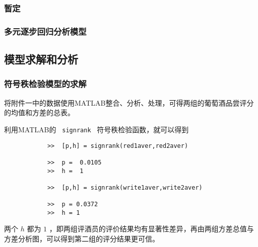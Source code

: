 \documentclass[nocover]{cumcmart}%
\begin{document}
        \subsubsection{暂定}


        \subsubsection{多元逐步回归分析模型}




    \subsection{模型求解和分析}

        \subsubsection{符号秩检验模型的求解}
        将附件一中的数据使用MATLAB整合、分析、处理，可得两组的葡萄酒品尝评分的均值和方差的总表。

        利用MATLAB的 \verb| signrank | 符号秩检验函数，就可以得到
        \begin{verbatim}
            >>  [p,h] = signrank(red1aver,red2aver)

            >>  p =  0.0105
            >>  h =  1

            >>  [p,h] = signrank(write1aver,write2aver)

            >>  p = 0.0372
            >>  h = 1

        \end{verbatim}

        两个 $h$ 都为 $1$ ，即两组评酒员的评价结果均有显著性差异，再由两组方差总值与方差分析图，可以得到第二组的评分结果更可信。
\end{document}

